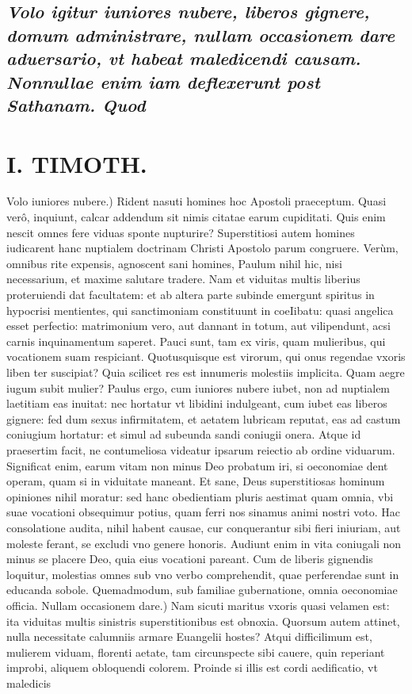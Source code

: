 \documentclass{article}
\begin{document}
\begin{pages}
\subsection*{\textit{Volo igitur iuniores nubere, liberos gignere, domum administrare, nullam occasionem dare aduersario, vt habeat maledicendi causam. Nonnullae enim iam deflexerunt post Sathanam. Quod }}
\section*{I. TIMOTH. }
\marginpar{[ p.64 ]}\pstart Volo iuniores nubere.) Rident nasuti homines hoc Apostoli praeceptum. Quasi verô, inquiunt, calcar addendum sit nimis citatae earum cupiditati. Quis enim nescit omnes fere viduas sponte nupturire? Superstitiosi autem homines iudicarent hanc nuptialem doctrinam Christi Apostolo parum congruere. Verùm, omnibus rite expensis, agnoscent sani homines, Paulum nihil hic, nisi necessarium, et maxime salutare tradere. Nam et viduitas multis liberius proteruiendi dat facultatem: et ab altera parte subinde emergunt spiritus in hypocrisi mentientes, qui sanctimoniam constituunt in coeIibatu: quasi angelica esset perfectio: matrimonium vero, aut dannant in totum, aut vilipendunt, acsi carnis inquinamentum saperet. Pauci sunt, tam ex viris, quam mulieribus, qui vocationem suam respiciant. Quotusquisque est virorum, qui onus regendae vxoris liben ter suscipiat? Quia scilicet res est innumeris molestiis implicita. Quam aegre iugum subit mulier? Paulus ergo, cum iuniores nubere iubet, non ad nuptialem laetitiam eas inuitat: nec hortatur vt libidini indulgeant, cum iubet eas liberos gignere: fed dum sexus infirmitatem, et aetatem lubricam reputat, eas ad castum coniugium hortatur: et simul ad subeunda sandi coniugii onera. Atque id praesertim facit, ne contumeliosa videatur ipsarum reiectio ab ordine viduarum. Significat enim, earum vitam non minus Deo probatum iri, si oeconomiae dent operam, quam si in viduitate maneant. Et sane, Deus superstitiosas hominum opiniones nihil moratur: sed hanc obedientiam pluris aestimat quam omnia, vbi suae vocationi obsequimur potius, quam ferri nos sinamus animi nostri voto. Hac consolatione audita, nihil habent causae, cur conquerantur sibi fieri iniuriam, aut moleste ferant, se excludi vno genere honoris. Audiunt enim in vita coniugali non minus se placere Deo, quia eius vocationi pareant. Cum de liberis gignendis loquitur, molestias omnes sub vno verbo comprehendit, quae perferendae sunt in educanda sobole. Quemadmodum, sub familiae gubernatione, omnia oeconomiae officia.  \pend\pstart Nullam occasionem dare.) Nam sicuti maritus vxoris quasi velamen est: ita viduitas multis sinistris superstitionibus est obnoxia. Quorsum autem attinet, nulla necessitate calumniis armare Euangelii hostes? Atqui difficilimum est, mulierem viduam, florenti aetate, tam circunspecte sibi cauere, quin reperiant improbi, aliquem obloquendi colorem. Proinde si illis est cordi aedificatio, vt maledicis  \pend
{}
{}

\end{pages}
\end{document}
